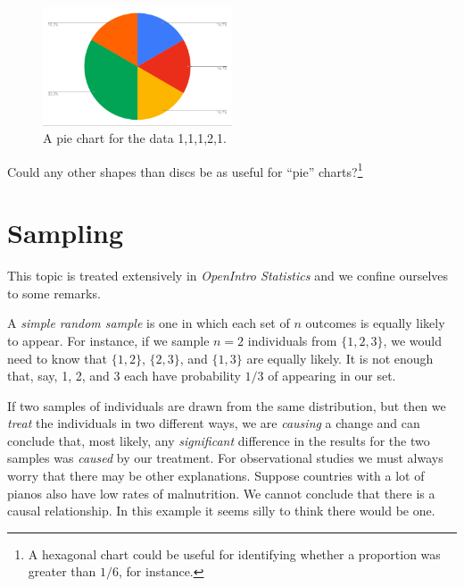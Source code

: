 \begin{figure}[h]
   \centering
   \includegraphics[width=0.5\textwidth]{ch_intro_to_data/figures/pie-chart-s4cs}
   \caption{A pie chart for the data 1,1,1,2,1.}
   \label{emailNumberPieChart}
\end{figure}

\begin{exercise}
	Could any other shapes than discs be as useful for ``pie'' charts?\footnote{A hexagonal chart could be useful for identifying whether a proportion was greater than $1/6$, for instance.}
\end{exercise}

\section{Sampling}

This topic is treated extensively in \emph{OpenIntro Statistics} and we confine ourselves to some remarks.

A \emph{simple random sample} is one in which each set of $n$ outcomes is equally likely to appear.
For instance, if we sample $n=2$ individuals from $\{1,2,3\}$, we would need to know that $\{1,2\}$, $\{2,3\}$, and $\{1,3\}$ are equally likely. It is not enough that, say, 1, 2, and 3 each have probability $1/3$ of appearing in our set.

If two samples of individuals are drawn from the same distribution, but then we \emph{treat} the individuals in two different ways, we are \emph{causing} a change and can conclude that, most likely, any \emph{significant} difference in the results for the two samples was \emph{caused} by our treatment. For observational studies we must always worry that there may be other explanations. Suppose countries with a lot of pianos also have low rates of malnutrition. We cannot conclude that there is a causal relationship. In this example it seems silly to think there would be one.


